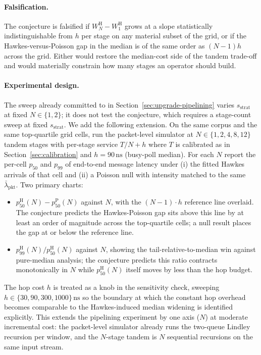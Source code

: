 \documentclass[11pt]{article}
\begin{document}
\paragraph{Falsification.} The conjecture is falsified if $W_N^{\mathrm{H}} - W_1^{\mathrm{H}}$ grows at a slope statistically indistinguishable from $h$ per stage on any material subset of the grid, or if the Hawkes-versus-Poisson gap in the median is of the same order as $(N-1)h$ across the grid. Either would restore the median-cost side of the tandem trade-off and would materially constrain how many stages an operator should build.

\paragraph{Experimental design.} The sweep already committed to in Section~\ref{sec:upgrade-pipelining} varies $s_{\mathrm{strat}}$ at fixed $N \in \{1, 2\}$; it does not test the conjecture, which requires a stage-count sweep at fixed $s_{\mathrm{strat}}$. We add the following extension. On the same corpus and the same top-quartile grid cells, run the packet-level simulator at $N \in \{1, 2, 4, 8, 12\}$ tandem stages with per-stage service $T/N + h$ where $T$ is calibrated as in Section~\ref{sec:calibration} and $h = 90\,\mathrm{ns}$ (busy-poll median). For each $N$ report the per-cell $p_{50}$ and $p_{99}$ of end-to-end message latency under (i) the fitted Hawkes arrivals of that cell and (ii) a Poisson null with intensity matched to the same $\bar\lambda_{\mathrm{pkt}}$. Two primary charts:

\begin{itemize}
    \item $p_{50}^{\mathrm{H}}(N) - p_{50}^{\mathrm{P}}(N)$ against $N$, with the $(N-1)\cdot h$ reference line overlaid. The conjecture predicts the Hawkes-Poisson gap sits above this line by at least an order of magnitude across the top-quartile cells; a null result places the gap at or below the reference line.
    \item $p_{99}^{\mathrm{H}}(N)/p_{50}^{\mathrm{H}}(N)$ against $N$, showing the tail-relative-to-median win against pure-median analysis; the conjecture predicts this ratio contracts monotonically in $N$ while $p_{50}^{\mathrm{H}}(N)$ itself moves by less than the hop budget.
\end{itemize}

The hop cost $h$ is treated as a knob in the sensitivity check, sweeping $h \in \{30, 90, 300, 1000\}\,\mathrm{ns}$ so the boundary at which the constant hop overhead becomes comparable to the Hawkes-induced median widening is identified explicitly. This extends the pipelining experiment by one axis ($N$) at moderate incremental cost: the packet-level simulator already runs the two-queue Lindley recursion per window, and the $N$-stage tandem is $N$ sequential recursions on the same input stream.
\end{document}
